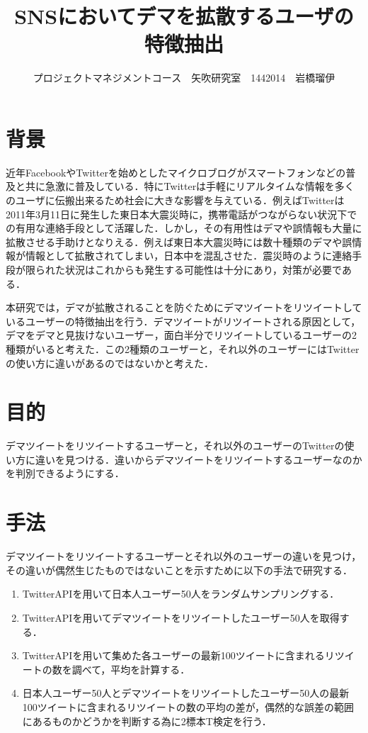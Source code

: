 \documentclass[uplatex,twocolumn,dvipdfmx]{jsarticle}
\title{\vspace{-5mm}\fontsize{14pt}{0pt}\selectfont SNSにおいてデマを拡散するユーザの特徴抽出}
\author{\normalsize プロジェクトマネジメントコース　矢吹研究室　1442014　岩橋瑠伊}
\date{}
\begin{document}
\fontsize{10.5pt}{\baselineskip}\selectfont
\maketitle





\section{背景}
近年FacebookやTwitterを始めとしたマイクロブログがスマートフォンなどの普及と共に急激に普及している．特にTwitterは手軽にリアルタイムな情報を多くのユーザに伝搬出来るため社会に大きな影響を与えている．例えばTwitterは2011年3月11日に発生した東日本大震災時に，携帯電話がつながらない状況下での有用な連絡手段として活躍した．しかし，その有用性はデマや誤情報も大量に拡散させる手助けとなりえる．例えば東日本大震災時には数十種類のデマや誤情報が情報として拡散されてしまい，日本中を混乱させた．震災時のように連絡手段が限られた状況はこれからも発生する可能性は十分にあり，対策が必要である\cite{dema}．

本研究では，デマが拡散されることを防ぐためにデマツイートをリツイートしているユーザーの特徴抽出を行う．デマツイートがリツイートされる原因として，デマをデマと見抜けないユーザー，面白半分でリツイートしているユーザーの2種類がいると考えた．この2種類のユーザーと，それ以外のユーザーにはTwitterの使い方に違いがあるのではないかと考えた．

\section{目的}
デマツイートをリツイートするユーザーと，それ以外のユーザーのTwitterの使い方に違いを見つける．違いからデマツイートをリツイートするユーザーなのかを判別できるようにする．

\section{手法}
デマツイートをリツイートするユーザーとそれ以外のユーザーの違いを見つけ，その違いが偶然生じたものではないことを示すために以下の手法で研究する．
\begin{enumerate}
\item TwitterAPIを用いて日本人ユーザー50人をランダムサンプリングする．
\item TwitterAPIを用いてデマツイートをリツイートしたユーザー50人を取得する．
\item TwitterAPIを用いて集めた各ユーザーの最新100ツイートに含まれるリツイートの数を調べて，平均を計算する．
\item 日本人ユーザー50人とデマツイートをリツイートしたユーザー50人の最新100ツイートに含まれるリツイートの数の平均の差が，偶然的な誤差の範囲にあるものかどうかを判断する為に2標本T検定を行う．
\end{enumerate}
\end{document}

